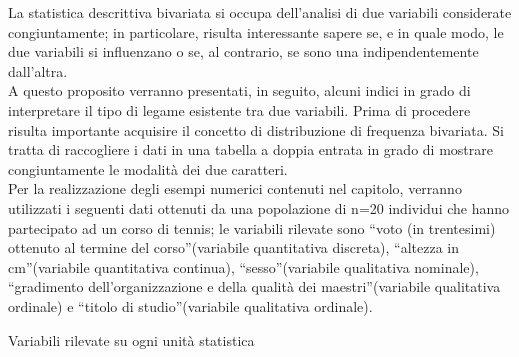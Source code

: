 La statistica descrittiva bivariata si occupa dell'analisi di due variabili 
considerate congiuntamente; in particolare, risulta interessante sapere se, 
e in quale modo, le due variabili si influenzano o se, al contrario, se 
sono una indipendentemente dall'altra.\\ 
A questo proposito verranno presentati, in seguito, alcuni indici in grado 
di interpretare il tipo di legame esistente tra due variabili. Prima di 
procedere risulta importante acquisire il concetto di distribuzione di 
frequenza bivariata. 
Si tratta di raccogliere i dati in una tabella a doppia entrata in grado di 
mostrare congiuntamente le modalità dei due caratteri.\\
Per la realizzazione degli esempi numerici contenuti nel capitolo, verranno 
utilizzati i seguenti dati ottenuti da una popolazione di n=20 individui 
che hanno partecipato ad un corso di tennis; le variabili rilevate sono 
\textquotedblleft voto (in trentesimi) ottenuto al termine del 
corso\textquotedblright (variabile quantitativa discreta), 
\textquotedblleft altezza in cm\textquotedblright (variabile quantitativa 
continua), \textquotedblleft sesso\textquotedblright (variabile qualitativa 
nominale), \textquotedblleft gradimento dell'organizzazione e della qualità 
dei maestri\textquotedblright (variabile qualitativa ordinale) e 
\textquotedblleft titolo di studio\textquotedblright (variabile qualitativa 
ordinale).

        Variabili rilevate su ogni unità statistica

